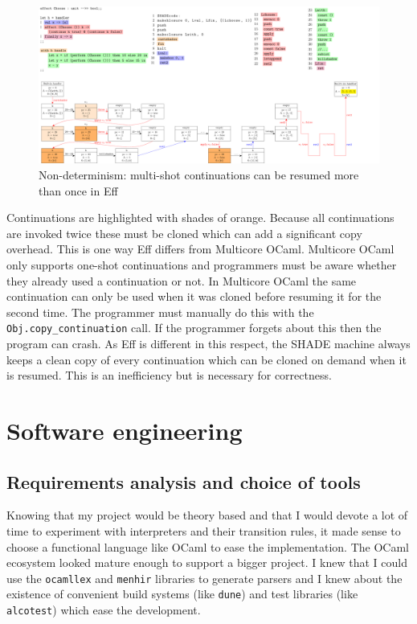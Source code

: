 \documentclass[class=article, crop=false]{standalone}
\begin{document}
\begin{landscape}
\begin{figure}[htb]
    \centering
    \includegraphics[width=\paperwidth]{../figures/impl-two-resume.pdf}
    \caption[Implementation of multi-shot continuations]{Non-determinism: multi-shot continuations can be resumed more than once in Eff}
    \label{fig:shadecode-two-resume}
\end{figure}

Continuations are highlighted with shades of orange. Because all continuations
are invoked twice these must be cloned which can add a significant copy overhead.
This is one way Eff differs from Multicore OCaml. Multicore OCaml only supports
one-shot continuations and programmers must be aware whether they already used
a continuation or not. In Multicore OCaml the same continuation can only be used
when it was cloned before resuming it for the second time. The programmer must
manually do this with the \lstinline|Obj.copy_continuation| call. If the
programmer forgets about this then the program can crash. As Eff is different
in this respect, the SHADE machine always keeps a clean copy of every
continuation which can be cloned on demand when it is resumed.
This is an inefficiency but is necessary for correctness.

\end{landscape}

\section{Software engineering}

\subsection{Requirements analysis and choice of tools}

Knowing that my project would be theory based and that I would devote a lot of
time to experiment with interpreters and their transition rules, it made sense
to choose a functional language like OCaml to ease the implementation.
The OCaml ecosystem looked mature enough to support a bigger project. I knew
that I could use the \lstinline|ocamllex| and \lstinline|menhir| libraries to
generate parsers and I knew about the existence of convenient build systems
(like \lstinline|dune|) and test libraries (like \lstinline|alcotest|)
which ease the development.
\end{document}

